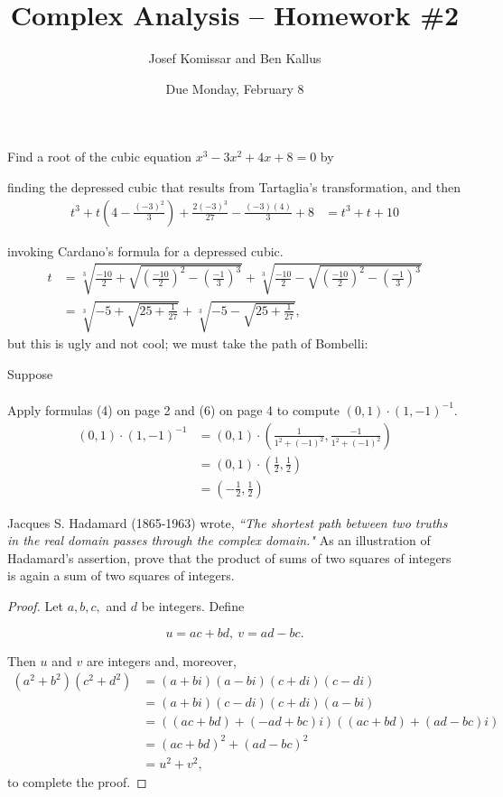 \documentclass[11pt]{article}       %
\title{Complex Analysis -- Homework \#2}
\author{ Josef Komissar and Ben Kallus }
\date{ Due Monday, February 8 }
\theoremstyle{definition}
\begin{document}
\pagecolor{black}
\color{white}
\maketitle

  Find a root of the cubic equation $x^3-3x^2+4x+8=0$ by

\medskip
{}  finding the depressed cubic that results from Tartaglia's transformation, and then
\begin{align*}
    t^3 + t\left(4 - \frac{(-3)^2}3\right) + \frac{2(-3)^3}{27} - \frac{(-3)(4)}3 + 8 &= t^3 + t + 10
\end{align*}

\medskip
{}  invoking Cardano's formula for a depressed cubic.
\begin{align*}
    t &= \sqrt[3]{\frac{-10}2 + \sqrt{\left(\frac{-10}2\right)^2 - \left(\frac{-1}3\right)^3}} + \sqrt[3]{\frac{-10}2 - \sqrt{\left(\frac{-10}2\right)^2 - \left(\frac{-1}3\right)^3}} \\
    &= \sqrt[3]{-5 + \sqrt{25 +\frac{1}{27}}} + \sqrt[3]{-5 - \sqrt{25 +\frac{1}{27}}},
\end{align*} but this is ugly and not cool; we must take the path of Bombelli:

Suppose 
\begin{align*}
\end{align*}

\bigskip
{}  Apply formulas (4) on page 2 and (6) on page 4 to compute $(0,1) \cdot (1,-1)^{-1}$.
\begin{align*}
    (0,1) \cdot (1,-1)^{-1} &= (0,1) \cdot \left(\frac1{1^2 + (-1)^2},\frac{-1}{1^2 + (-1)^2}\right) \\
                            &= (0,1) \cdot \left(\frac12, \frac12\right) \\
                            &= \left(-\frac12, \frac12\right)
\end{align*}

\bigskip
{}  Jacques S. Hadamard (1865-1963) wrote, {\sl ``The shortest path between two truths in the real domain passes through the complex domain."}
As an illustration of Hadamard's assertion,  prove that the product of sums of two squares of integers is again a sum of two squares of integers.

\begin{proof}
Let $a, b, c,$ and $d$ be integers.  Define 

$$u=ac+bd,~v=ad-bc.$$

Then $u$ and $v$ are integers and, moreover,
\begin{align*}
(a^2+b^2)(c^2+d^2) &= (a+bi)(a-bi)(c+di)(c-di) \\
                   &= (a+bi)(c-di)(c+di)(a-bi) \\
                   &= ((ac+bd)+(-ad+bc)i)((ac+bd)+(ad-bc)i) \\
                   &= (ac+bd)^2 + (ad-bc)^2 \\
                   &= u^2 + v^2,
\end{align*} to complete the proof.
\end{proof}
\end{document}

